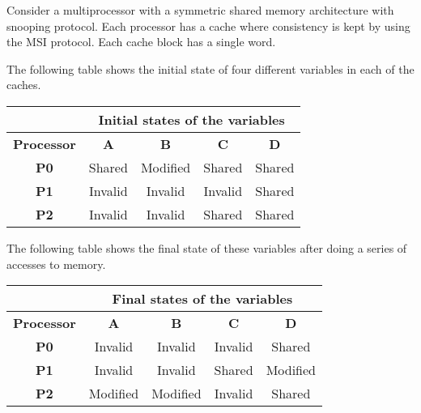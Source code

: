 \begin{acexercise}\end{acexercise}

Consider a multiprocessor with a symmetric shared memory architecture 
with snooping protocol. 
Each processor has a cache where consistency is kept by using the MSI protocol.
Each cache block has a single word.

The following table shows the initial state of four different variables in
each of the caches.

\medskip

\begin{tabular}{|c|c|c|c|c|}
\hline
&
\multicolumn{4}{|c|}{Initial states of the variables}
\\
\hline

\textbf{Processor} &
\textbf{A} &
\textbf{B} &
\textbf{C} &
\textbf{D}
\\
\hline
\hline

\textbf{P0} & 
Shared & Modified & Shared & Shared
\\
\hline

\textbf{P1} &
Invalid & Invalid & Invalid & Shared
\\
\hline

\textbf{P2} &
Invalid & Invalid & Shared & Shared
\\
\hline

\end{tabular}

\medskip

The following table shows the final state of these variables after doing a
series of accesses to memory.

\medskip

\begin{tabular}{|c|c|c|c|c|}
\hline
&
\multicolumn{4}{|c|}{Final states of the variables}
\\
\hline

\textbf{Processor} &
\textbf{A} &
\textbf{B} &
\textbf{C} &
\textbf{D}
\\
\hline
\hline

\textbf{P0} & 
Invalid & Invalid & Invalid & Shared
\\
\hline

\textbf{P1} &
Invalid & Invalid & Shared & Modified
\\
\hline

\textbf{P2} &
Modified & Modified & Invalid & Shared
\\
\hline

\end{tabular}

